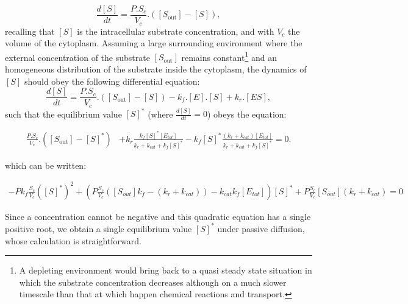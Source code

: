 \begin{equation}
\frac{d[S]}{dt}=\frac{P.S_c}{V_c}.([S_\text{out}]-[S]),
\end{equation}
\noindent recalling that $[S]$ is the intracellular substrate concentration, and with $V_c$ the volume of the cytoplasm. Assuming a large surrounding environment where the external concentration of the substrate $[S_\text{out}]$ remains constant\footnote{A depleting environment would bring back to a quasi steady state situation in which the substrate concentration decreases although on a much slower timescale than that at which happen chemical reactions and transport.} and an homogeneous distribution of the substrate inside the cytoplasm, the dynamics of $[S]$ should obey the following differential equation:
\begin{equation}
\frac{d[S]}{dt}=\frac{P.S_c}{V_c}.([S_\text{out}]-[S])-k_f.[E].[S]+k_r.[ES],
\label{MMT_equa_PD}
\end{equation}
\noindent such that the equilibrium value $[S]^*$ (where $\frac{d[S]}{dt}=0$) obeys the equation:

\begin{align*}
\frac{P.S_{c}}{V_c}.([S_\text{out}]-[S]^*)&+k_{r}\frac{k_f[S]^*[E_{tot}]}{k_{r}+k_{cat}+k_f[S]^*}
-k_f[S]^*\frac{(k_{r}+k_{cat})[E_{tot}]}{k_r+k_{cat}+k_f[S]^*}=0.
\end{align*}

\noindent which can be written:

\begin{align}
-Pk_f\frac{S_c}{V_c}([S]^*)^2+(P\frac{S_c}{V_c}([S_{out}]k_f-(k_r+k_{cat}))-k_{cat}k_f[E_{tot}])[S]^*+P\frac{S_c}{V_c}[S_{out}](k_r+k_{cat})=0
\end{align}

Since a concentration cannot be negative and this quadratic equation has a single positive root, we obtain a single equilibrium value $[S]^*$ under passive diffusion, whose calculation is straightforward.

